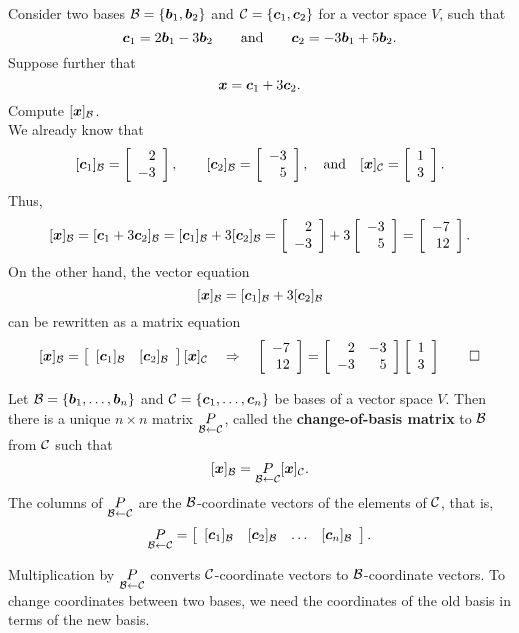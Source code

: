 \begin{Exam} Consider two bases $\B = \{\bb b_1,\bb b_2\}$ and $\c = \{\bb c_1, \bb c_2\}$ for a vector space $V$, such that 
\[\bb c_1 = 2\bb b_1 - 3\bb b_2\qquad\text{and}\qquad \bb c_2 = -3\bb b_1+5\bb b_2.\] Suppose further that 
\[\bb x = \bb c_1+ 3\bb c_2.\] Compute $[\bb x]_\B$.\\

We already know that  
\[[\bb c_1]_\B = \vr{2\\-3}, \qquad [\bb c_2]_\B = \vr{-3\\5}, \quad\text{and}\quad[\bb x]_\c = \vr{1\\3}.\] Thus,
\[[\bb x]_\B = [\bb c_1 + 3\bb c_2]_\B = [\bb c_1]_\B + 3[\bb c_2]_\B = \vr{2\\-3} + 3\vr{-3\\5} = \vr{-7\\12}.\]
On the other hand, the vector equation
\[[\bb x]_\B = [\bb c_1]_\B + 3[\bb c_2]_\B\] can be rewritten as a matrix equation
\[  [\bb x]_\B =\mtx{cc}{[\bb c_1]_\B & [\bb c_2]_\B}[\bb x]_\c \qRightarrow \vr{-7\\12}=\mtx{rr}{2&-3\\-3&5}\vr{1\\3}  \qedhere\]
\end{Exam}\vs

\begin{Thm} Let  $\B = \{\bb b_1, \ldots, \bb b_n\}$ and $\c = \{\bb c_1, \ldots, \bb c_n\}$  be bases of a vector space $V$. Then there is a unique $n\times n$ matrix $\underset{\B\leftarrow \c}{P}$, called the \textbf{change-of-basis matrix} to $\B$ from $\c$  such that
\[[\bb x]_\B = \underset{\B\leftarrow \c}{P}[\bb x]_\c.\] The columns of $\underset{\B\leftarrow \c}{P}$ are the $\B$-coordinate vectors of the elements of $\c$, that is, 
\[\underset{\B\leftarrow \c}{P} = \mtx{cccc}{[\bb c_1]_\B & [\bb c_2]_\B & \ldots & [\bb c_n]_\B}.\]
\end{Thm}\vs

Multiplication by $\underset{\B\leftarrow \c}{P}$ converts $\c$-coordinate vectors to $\B$-coordinate vectors. To change coordinates between two bases, we need the coordinates of the old basis in terms of the new basis.\\

